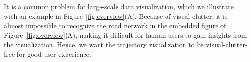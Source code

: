 




 It is a common problem for large-scale data visualization, which we illustrate with an example in Figure~\ref{fig:overview}(A). Because of visual clutter, it is almost impossible to recognize the road network in the embedded figure of Figure~\ref{fig:overview}(A), making it difficult for human-users to gain insights from the visualization. Hence, we want the trajectory visualization to be visual-clutter-free for good user experience.

%



